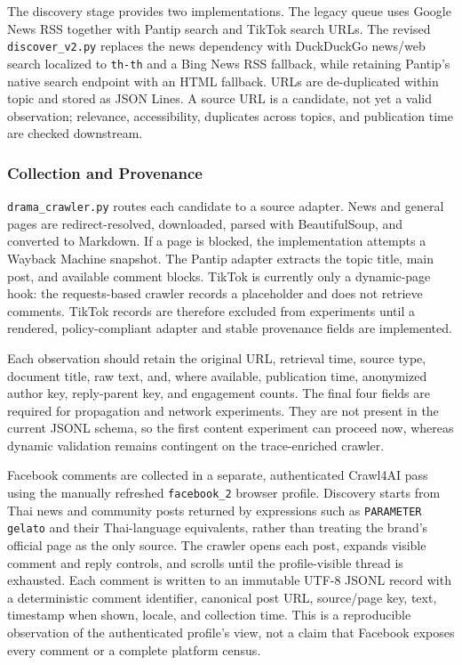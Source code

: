 \documentclass[conference]{IEEEtran}
\begin{document}
The discovery stage provides two implementations. The legacy queue uses Google
News RSS together with Pantip search and TikTok search URLs. The revised
\texttt{discover\_v2.py} replaces the news dependency with DuckDuckGo news/web
search localized to \texttt{th-th} and a Bing News RSS fallback, while retaining
Pantip's native search endpoint with an HTML fallback. URLs are de-duplicated
within topic and stored as JSON Lines. A source URL is a candidate, not yet a
valid observation; relevance, accessibility, duplicates across topics, and
publication time are checked downstream.

\subsubsection{Collection and Provenance}

\texttt{drama\_crawler.py} routes each candidate to a source adapter. News and
general pages are redirect-resolved, downloaded, parsed with BeautifulSoup,
and converted to Markdown. If a page is blocked, the implementation attempts a
Wayback Machine snapshot. The Pantip adapter extracts the topic title, main
post, and available comment blocks. TikTok is currently only a dynamic-page
hook: the requests-based crawler records a placeholder and does not retrieve
comments. TikTok records are therefore excluded from experiments until a
rendered, policy-compliant adapter and stable provenance fields are implemented.

Each observation should retain the original URL, retrieval time, source type,
document title, raw text, and, where available, publication time, anonymized
author key, reply-parent key, and engagement counts. The final four fields are
required for propagation and network experiments. They are not present in the
current JSONL schema, so the first content experiment can proceed now, whereas
dynamic validation remains contingent on the trace-enriched crawler.

Facebook comments are collected in a separate, authenticated Crawl4AI pass
using the manually refreshed \texttt{facebook\_2} browser profile. Discovery
starts from Thai news and community posts returned by expressions such as
\texttt{PARAMETER gelato} and their Thai-language equivalents, rather than
treating the brand's official page as
the only source. The crawler opens each post, expands visible comment and reply
controls, and scrolls until the profile-visible thread is exhausted. Each
comment is written to an immutable UTF-8 JSONL record with a deterministic
comment identifier, canonical post URL, source/page key, text, timestamp when
shown, locale, and collection time. This is a reproducible observation of the
authenticated profile's view, not a claim that Facebook exposes every comment
or a complete platform census.
\end{document}
